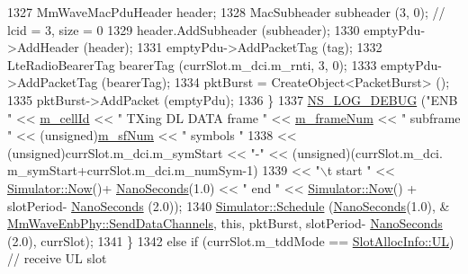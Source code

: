 \begin{DoxyCode}
1327                         MmWaveMacPduHeader header;
1328                         MacSubheader subheader (3, 0);  \textcolor{comment}{// lcid = 3, size = 0}
1329                         header.AddSubheader (subheader);
1330                         emptyPdu->AddHeader (header);
1331                         emptyPdu->AddPacketTag (tag);
1332                         LteRadioBearerTag bearerTag (currSlot.m\_dci.m\_rnti, 3, 0);
1333                         emptyPdu->AddPacketTag (bearerTag);
1334                         pktBurst = CreateObject<PacketBurst> ();
1335                         pktBurst->AddPacket (emptyPdu);
1336                 \}
1337                 \hyperlink{group__logging_ga413f1886406d49f59a6a0a89b77b4d0a}{NS\_LOG\_DEBUG} (\textcolor{stringliteral}{"ENB "} << \hyperlink{classns3_1_1MmWavePhy_a0594531da45f93220d4f5de292bae823}{m\_cellId} << \textcolor{stringliteral}{" TXing DL DATA frame "} << 
      \hyperlink{classns3_1_1MmWavePhy_a852ce585035a1c12122d2775e64ff38a}{m\_frameNum} << \textcolor{stringliteral}{" subframe "} << (\textcolor{keywordtype}{unsigned})\hyperlink{classns3_1_1MmWavePhy_af3d76eb9f3e5e1ff669852d05986c1a3}{m\_sfNum} << \textcolor{stringliteral}{" symbols "}
1338                               << (\textcolor{keywordtype}{unsigned})currSlot.m\_dci.m\_symStart << \textcolor{stringliteral}{"-"} << (\textcolor{keywordtype}{unsigned})(currSlot.m\_dci.
      m\_symStart+currSlot.m\_dci.m\_numSym-1)
1339                               << \textcolor{stringliteral}{"\(\backslash\)t start "} << \hyperlink{classns3_1_1Simulator_ac3178fa975b419f7875e7105be122800}{Simulator::Now}()+
      \hyperlink{group__timecivil_ga281d64bcb4dad96267d83c7688ec433f}{NanoSeconds}(1.0) << \textcolor{stringliteral}{" end "} << \hyperlink{classns3_1_1Simulator_ac3178fa975b419f7875e7105be122800}{Simulator::Now}() + slotPeriod-
      \hyperlink{group__timecivil_ga281d64bcb4dad96267d83c7688ec433f}{NanoSeconds} (2.0));
1340                 \hyperlink{classns3_1_1Simulator_a671882c894a08af4a5e91181bf1eec13}{Simulator::Schedule} (\hyperlink{group__timecivil_ga281d64bcb4dad96267d83c7688ec433f}{NanoSeconds}(1.0), &
      \hyperlink{classns3_1_1MmWaveEnbPhy_a2e177ec4620eeb040bb622ab32bd2432}{MmWaveEnbPhy::SendDataChannels}, \textcolor{keyword}{this}, pktBurst, slotPeriod-
      \hyperlink{group__timecivil_ga281d64bcb4dad96267d83c7688ec433f}{NanoSeconds} (2.0), currSlot);
1341         \}
1342         \textcolor{keywordflow}{else} \textcolor{keywordflow}{if} (currSlot.m\_tddMode == \hyperlink{structns3_1_1SlotAllocInfo_a6cad60db1d39034f1851e2cea625fe5da916b5be54594ead6ed677c570311cad2}{SlotAllocInfo::UL})  \textcolor{comment}{// receive UL slot}

\end{DoxyCode}
